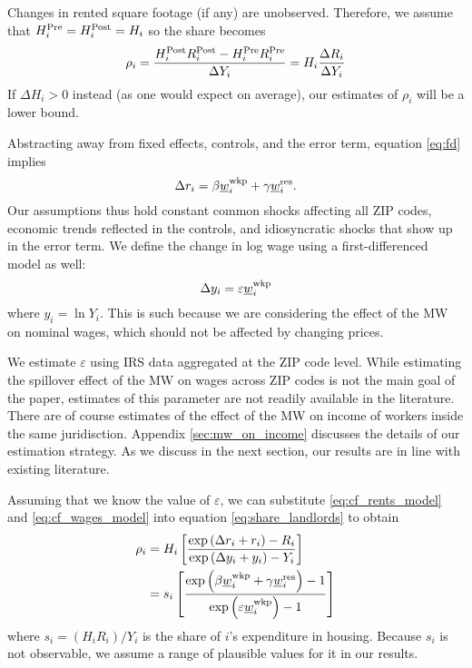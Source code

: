 Changes in rented square footage (if any) are unobserved.
Therefore, we assume that
$H^{\text{Pre}}_i = H^{\text{Post}}_i = H_i$ 
so the share becomes
\begin{equation}\label{eq:share_landlords}
    \rho_i = \frac{H^{\text{Post}}_i R^{\text{Post}}_i - H^{\text{Pre}}_i R^{\text{Pre}}_i}{\Delta Y_i} = 
                H_i \frac{\Delta R_i}{\Delta Y_i}
\end{equation}
If $\Delta H_i > 0$ instead (as one would expect on average), 
our estimates of $\rho_i$ will be a lower bound.

Abstracting away from fixed effects, controls, and the error term, 
equation \eqref{eq:fd} implies
\begin{equation}\label{eq:cf_rents_model}
    \Delta r_i = \beta \underline{w}_i^{\text{wkp}} + \gamma \underline{w}_i^{\text{res}} .
\end{equation}
Our assumptions thus hold 
constant common shocks affecting all ZIP codes,
economic trends reflected in the controls, and
idiosyncratic shocks that show up in the error term.
We define the change in log wage using a first-differenced model as well:
\begin{equation}\label{eq:cf_wages_model}
    \Delta y_i = \varepsilon \underline{w}_i^{\text{wkp}}
\end{equation}
where $y_i=\ln Y_i$.
This is such because we are considering the effect of the MW on nominal wages,
which should not be affected by changing prices.

We estimate $\varepsilon$ using IRS data aggregated at the ZIP code level.
While estimating the spillover effect of the MW on wages across ZIP codes is 
not the main goal of the paper, 
estimates of this parameter are not readily available in the literature.
There are of course estimates of the effect of the MW on income of workers
inside the same juridisction.
Appendix \ref{sec:mw_on_income} discusses the details of our estimation 
strategy.
As we discuss in the next section, our results are in line with existing 
literature.

%
%
%

Assuming that we know the value of $\varepsilon$, we can substitute
\eqref{eq:cf_rents_model} and \eqref{eq:cf_wages_model} into equation
\eqref{eq:share_landlords} to obtain
\begin{equation}\label{eq:rho}
    \begin{split}
        \rho_i & = H_i \left[ 
        \frac{\exp \left(\Delta r_i + r_i \right) - R_i }
             {\exp \left(\Delta y_i + y_i \right) - Y_i }
        \right] \\
        & = s_i \left[
            \frac{\exp \left( \beta \underline{w}_i^{\text{wkp}} + \gamma \underline{w}_i^{\text{res}} \right) - 1 }
                {\exp \left( \varepsilon \underline{w}_i^{\text{wkp}} \right) - 1 }
            \right]
    \end{split}
\end{equation}
where $s_i = \left(H_i R_i\right)/Y_i$ is the share of $i$'s expenditure in 
housing.
Because $s_i$ is not observable, we assume a range of plausible values for it
in our results.

